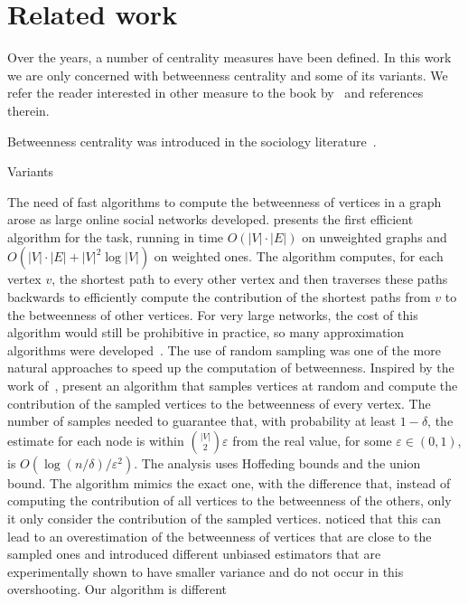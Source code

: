\section{Related work}\label{sec:prevwork}
Over the years, a number of centrality measures have been defined. In this work
we are only concerned with betweenness centrality and some of its variants. We
refer the reader interested in other measure to the book by~\citet{Newman10} and
references therein.

Betweenness centrality was introduced in the sociology
literature~\citep{Anthonisse71,Freeman77}. 

Variants~\citep{Brandes08,DolevEP10,KourtellisASIT12,PfefferC12}

The need of fast algorithms to compute
the betweenness of vertices in a graph arose as large online social networks
developed. \citet{Brandes01} presents the first efficient algorithm for the
task, running in time $O(|V|\cdot|E|)$ on unweighted graphs and
$O(|V|\cdot|E|+|V|^2\log|V|)$ on weighted ones. The algorithm computes, for each
vertex $v$, the shortest path to every other vertex and then traverses these paths
backwards to efficiently compute the contribution of the shortest paths from $v$
to the betweenness of other vertices. For very large networks, the cost of this
algorithm would still be prohibitive in practice, so many approximation
algorithms were
developed~\citep{JacobKLPT05,BrandesP07,BaderKMM07,GeisbergerSS08,MaiyaBW10,LimMRT11}.
The use of random sampling was one of the more natural approaches to speed up
the computation of betweenness. Inspired by the work of~\citet{EppsteinW04},
\citet{JacobKLPT05,BrandesP07} present an algorithm that samples vertices at
random and compute the contribution of the sampled vertices to the betweenness
of every vertex. The number of samples needed to guarantee that, with
probability at least $1-\delta$, the estimate for each node is within
$\binom{|V|}{2}\varepsilon$ from the real value, for some $\varepsilon\in(0,1)$,
is $O(\log(n/\delta)/\varepsilon^2)$. The analysis uses Hoffeding bounds and the
union bound. The algorithm mimics the exact one, with the difference
that, instead of computing the contribution of all vertices to the betweenness
of the others, only it only consider the contribution of the sampled vertices.
\citet{GeisbergerSS08} noticed that this can lead to an overestimation of the
betweenness of vertices that are close to the sampled ones and introduced
different unbiased estimators that are experimentally shown to have smaller
variance and do not occur in this overshooting. Our algorithm is different
